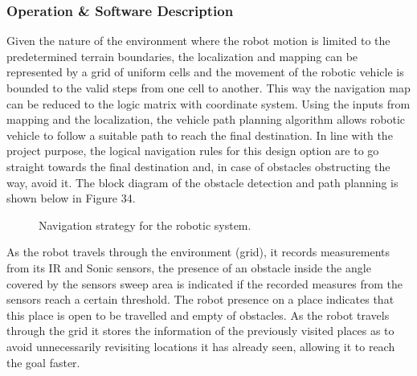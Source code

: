 \documentclass[a4paper]{article}
\begin{document}
\subsubsection{Operation \& Software Description}
Given the nature of the environment where the robot motion is limited to the predetermined terrain boundaries, the localization and mapping can be represented by a grid of uniform cells and the movement of the robotic vehicle is bounded to the valid steps from one cell to another. This way the navigation map can be reduced to the logic matrix with coordinate system. Using the inputs from mapping and the localization, the vehicle path planning algorithm allows robotic vehicle to follow a suitable path to reach the final destination. In line with the project purpose, the logical navigation rules for this design option are to go straight towards the final destination and, in case of obstacles obstructing the way, avoid it. The block diagram of the obstacle detection and path planning is shown below in Figure 34.\\

\begin{figure}[h]
\centering
{}
\caption{Navigation strategy for the robotic system.}
\end{figure}

As the robot travels through the environment (grid), it records measurements from its IR and Sonic sensors, the presence of an obstacle inside the angle covered by the sensors sweep area is indicated if the recorded measures from the sensors reach a certain threshold. The robot presence on a place indicates that this place is open to be travelled and empty of obstacles. As the robot travels through the grid it stores the information of the previously visited places as to avoid unnecessarily revisiting locations it has already seen, allowing it to reach the goal faster.\\
\end{document}
